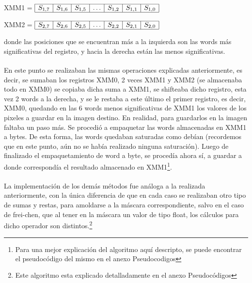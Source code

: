 \documentclass[11pt, a4paper]{article}
\begin{document}
\begin{center}
XMM1 = $\begin{array}{|c|c|c|c|c|c|c|}
\hline
S_{1,7} & S_{1,6} & S_{1,5} & \ldots & S_{1,2} & S_{1,1} & S_{1,0}\\
\hline
\end{array} $
\end{center}

\begin{center}
XMM2 = $\begin{array}{|c|c|c|c|c|c|c|}
\hline
S_{2,7} & S_{2,6} & S_{2,5} & \ldots & S_{2,2} & S_{2,1} & S_{2,0}\\
\hline
\end{array} $
\end{center}

donde las posiciones que se encuentran m\'as a la izquierda son las words m\'as significativas del registro, y hacia la derecha est\'an las menos significativas.

\paragraph{}
En este punto se realizaban las mismas operaciones explicadas anteriormente, es decir, se sumaban los registros XMM0, 2 veces XMM1 y XMM2 (se almacenaba todo en XMM0) se copiaba dicha suma a XMM1, se shifteaba dicho registro, esta vez 2 words a la derecha, y se le restaba a este \'ultimo el primer registro, es decir, XMM0, quedando en las 6 words menos significativas de XMM1 los valores de los pixeles a guardar en la imagen destino. En realidad, para guardarlos en la imagen faltaba un paso m\'as. Se procedi\'o a empaquetar las words almacenadas en XMM1 a bytes. De esta forma, las words quedaban saturadas como deb\'ian (recordemos que en este punto, a\'un no se hab\'ia realizado ninguna saturaci\'on). Luego de finalizado el empaquetamiento de word a byte, se proced\'ia ahora s\'i, a guardar a donde correspond\'ia el resultado almacenado en XMM1\footnote{Para una mejor explicaci\'on del algoritmo aqu\'i descripto, se puede encontrar el pseudoc\'odigo del mismo en el anexo Pseudocodigos}.


\paragraph{}
La implementaci\'on de los dem\'as m\'etodos fue an\'aloga a la realizada anteriormente, con la \'unica diferencia de que en cada caso se realizaban otro tipo de sumas y restas, para amoldarse a la m\'ascara correspondiente, salvo en el caso de frei-chen, que al tener en la m\'ascara un valor de tipo float, los c\'alculos para dicho operador son distintos.\footnote{Este algoritmo esta explicado detalladamente en el anexo Pseudoc\'odigos}
\end{document}
